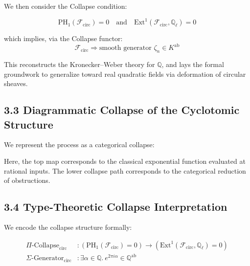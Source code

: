 \documentclass[11pt]{article}
\begin{document}
We then consider the Collapse condition:

\[
\boxed{
\mathrm{PH}_1(\mathcal{F}_{\mathrm{circ}}) = 0 \quad \text{and} \quad \mathrm{Ext}^1(\mathcal{F}_{\mathrm{circ}}, \mathbb{Q}_\ell) = 0
}
\]

which implies, via the Collapse functor:
\[
\mathcal{F}_{\mathrm{circ}} \Rightarrow \text{smooth generator } \zeta_n \in K^{\mathrm{ab}}
\]

This reconstructs the Kronecker–Weber theory for \( \mathbb{Q} \), and lays the formal groundwork to generalize toward real quadratic fields via deformation of circular sheaves.

\subsection{3.3 Diagrammatic Collapse of the Cyclotomic Structure}

We represent the process as a categorical collapse:

\begin{center}
\end{center}

Here, the top map corresponds to the classical exponential function evaluated at rational inputs.  
The lower collapse path corresponds to the categorical reduction of obstructions.

\subsection{3.4 Type-Theoretic Collapse Interpretation}

We encode the collapse structure formally:

\begin{align*}
\Pi\text{-Collapse}_{\mathrm{circ}} &: \left(\mathrm{PH}_1(\mathcal{F}_{\mathrm{circ}}) = 0 \right) \rightarrow \left(\mathrm{Ext}^1(\mathcal{F}_{\mathrm{circ}}, \mathbb{Q}_\ell) = 0 \right) \\
\Sigma\text{-Generator}_{\mathrm{circ}} &: \exists \alpha \in \mathbb{Q}.\ e^{2\pi i \alpha} \in \mathbb{Q}^{\mathrm{ab}}
\end{align*}
\end{document}
